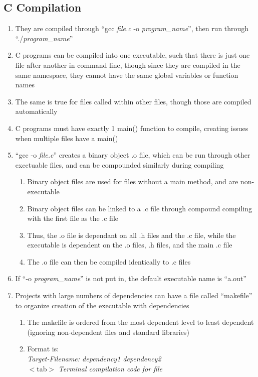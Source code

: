 \documentclass[11 pt, twoside]{article}
\begin{document}
\subsection{C Compilation}
\begin{enumerate}
\item They are compiled through ``gcc \textit{file.c} -o \textit{program\_name}'', then run through ``./\textit{program\_name}''
\item C programs can be compiled into one executable, such that there is just one file after another in command line, though since they are compiled in the same namespace, they cannot have the same global variables or function names
\item The same is true for files called within other files, though those are compiled automatically
\item C programs must have exactly 1 main() function to compile, creating issues when multiple files have a main()
\item ``gcc -o \textit{file.c}'' creates a binary object .o file, which can be run through other exectuable files, and can be compounded similarly during compiling
\begin{enumerate}
\item Binary object files are used for files without a main method, and are non-executable
\item Binary object files can be linked to a .c file through compound compiling with the first file as the .c file
\item Thus, the .o file is dependant on all .h files and the .c file, while the executable is dependent on the .o files, .h files, and the main .c file
\item The .o file can then be compiled identically to .c files
\end{enumerate}
\item If ``-o \textit{program\_name}'' is not put in, the default executable name is ``a.out''
\item Projects with large numbers of dependencies can have a file called ``makefile'' to organize creation of the executable with dependencies
\begin{enumerate}
\item The makefile is ordered from the most dependent level to least dependent (ignoring non-dependent files and standard libraries)
\item Format is: \\ \textit{Target-Filename: dependency1 dependency2}\\ $<$tab$>$ \textit{Terminal compilation code for file}

\end{enumerate}
\end{enumerate}
\end{document}
